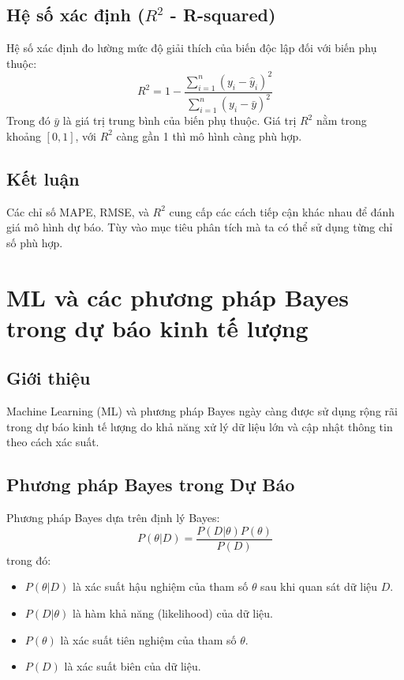 \subsection{Hệ số xác định ($R^2$ - R-squared)}
Hệ số xác định đo lường mức độ giải thích của biến độc lập đối với biến phụ thuộc:
\begin{equation}
    R^2 = 1 - \frac{\sum_{i=1}^{n} (y_i - \hat{y}_i)^2}{\sum_{i=1}^{n} (y_i - \bar{y})^2}
\end{equation}
Trong đó $\bar{y}$ là giá trị trung bình của biến phụ thuộc. Giá trị $R^2$ nằm trong khoảng $[0,1]$, với $R^2$ càng gần 1 thì mô hình càng phù hợp.

\subsection{Kết luận}
Các chỉ số MAPE, RMSE, và $R^2$ cung cấp các cách tiếp cận khác nhau để đánh giá mô hình dự báo. Tùy vào mục tiêu phân tích mà ta có thể sử dụng từng chỉ số phù hợp.






\section{ML và các phương pháp Bayes trong dự báo kinh tế lượng}
\subsection{Giới thiệu}
Machine Learning (ML) và phương pháp Bayes ngày càng được sử dụng rộng rãi trong dự báo kinh tế lượng do khả năng xử lý dữ liệu lớn và cập nhật thông tin theo cách xác suất.

\subsection{Phương pháp Bayes trong Dự Báo}
Phương pháp Bayes dựa trên định lý Bayes:
\begin{equation}
    P(\theta | D) = \frac{P(D | \theta) P(\theta)}{P(D)}
\end{equation}
trong đó:
\begin{itemize}
    \item $P(\theta | D)$ là xác suất hậu nghiệm của tham số $\theta$ sau khi quan sát dữ liệu $D$.
    \item $P(D | \theta)$ là hàm khả năng (likelihood) của dữ liệu.
    \item $P(\theta)$ là xác suất tiên nghiệm của tham số $\theta$.
    \item $P(D)$ là xác suất biên của dữ liệu.
\end{itemize}

